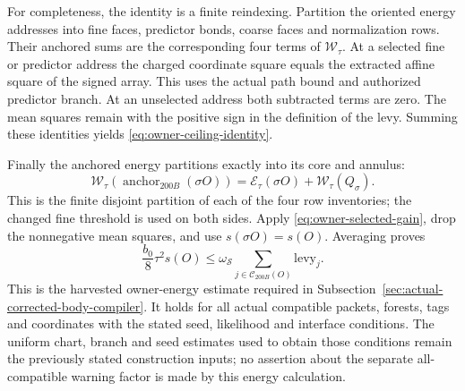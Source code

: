 For completeness, the identity is a finite reindexing. Partition
the oriented energy addresses into fine faces, predictor bonds,
coarse faces and normalization rows. Their anchored sums are
the corresponding four terms of $\mathcal W_\tau$. At a
selected fine or predictor address the charged coordinate square
equals the extracted affine square of the signed array. This
uses the actual path bound and authorized predictor branch.
At an unselected address both subtracted terms are zero. The
mean squares remain with the positive sign in the definition
of the levy. Summing these identities yields
\eqref{eq:owner-ceiling-identity}.

Finally the anchored energy partitions exactly into its core
and annulus:
\[
 \mathcal W_\tau(\operatorname{anchor}_{200B}(\sigma O))
 =\mathcal E_\tau(\sigma O)+\mathcal W_\tau(Q_\sigma).
\]
This is the finite disjoint partition of each of the four row
inventories; the changed fine threshold is used on both sides.
Apply \eqref{eq:owner-selected-gain}, drop the nonnegative
mean squares, and use $s(\sigma O)=s(O)$. Averaging proves
\begin{equation}\label{eq:owner-actual-heft}
 \frac{b_0}{8}\tau^2s(O)
 \le\omega_{\mathcal S}\sum_{j\in\mathcal C_{200B}(O)}
               \mathrm{levy}_j.
\end{equation}
This is the harvested owner-energy estimate required in
Subsection~\ref{sec:actual-corrected-body-compiler}. It holds for
all actual compatible packets, forests, tags and coordinates
with the stated seed, likelihood and interface conditions. The
uniform chart, branch and seed estimates used to obtain those
conditions remain the previously stated construction inputs;
no assertion about the separate all-compatible warning factor
is made by this energy calculation.
